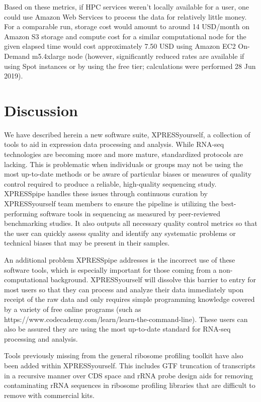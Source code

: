 \documentclass[11pt, a4paper, oneside]{article}
\begin{document}
Based on these metrics, if HPC services weren't locally available for a user, one could use Amazon Web Services to process the data for relatively little money. For a comparable run, storage cost would amount to around 14 USD/month on Amazon S3 storage and compute cost for a similar computational node for the given elapsed time would cost approximately 7.50 USD using Amazon EC2 On-Demand m5.4xlarge node (however, significantly reduced rates are available if using Spot instances or by using the free tier; calculations were performed 28 Jun 2019).


\section{Discussion}
We have described herein a new software suite, XPRESSyourself, a collection of tools to aid in expression data processing and analysis. While RNA-seq technologies are becoming more and more mature, standardized protocols are lacking. This is problematic when individuals or groups may not be using the most up-to-date methods or be aware of particular biases or measures of quality control required to produce a reliable, high-quality sequencing study. XPRESSpipe handles these issues through continuous curation by XPRESSyourself team members to ensure the pipeline is utilizing the best-performing software tools in sequencing as measured by peer-reviewed benchmarking studies. It also outputs all necessary quality control metrics so that the user can quickly assess quality and identify any systematic problems or technical biases that may be present in their samples. \par

An additional problem XPRESSpipe addresses is the incorrect use of these software tools, which is especially important for those coming from a non-computational background. XPRESSyourself will dissolve this barrier to entry for most users so that they can process and analyze their data immediately upon receipt of the raw data and only requires simple programming knowledge covered by a variety of free online programs (such as https://www.codecademy.com/learn/learn-the-command-line). These users can also be assured they are using the most up-to-date standard for RNA-seq processing and analysis. \par

Tools previously missing from the general ribosome profiling toolkit have also been added within XPRESSyourself. This includes GTF truncation of transcripts in a recursive manner over CDS space and rRNA probe design aids for removing contaminating rRNA sequences in ribosome profiling libraries that are difficult to remove with commercial kits. \par
\end{document}
